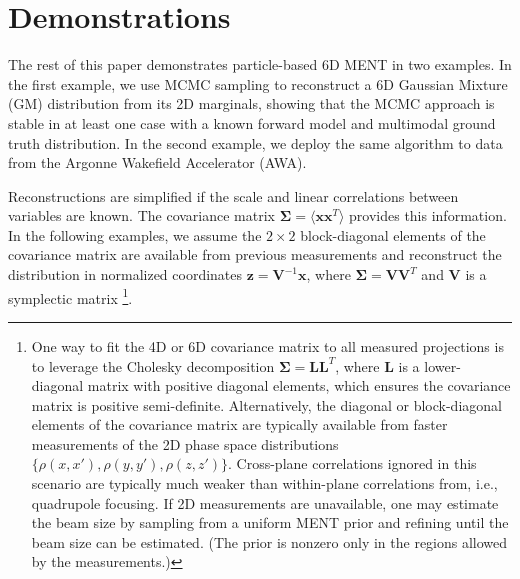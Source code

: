 \documentclass[%
    reprint,
    twocolumn,
    amsmath,
    amssymb,
    aps,
    prstab,
]{revtex4-2}
\begin{document}
\section{Demonstrations}\label{sec:method-demonstration}

The rest of this paper demonstrates particle-based 6D MENT in two examples. In the first example, we use MCMC sampling to reconstruct a 6D Gaussian Mixture (GM) distribution from its 2D marginals, showing that the MCMC approach is stable in at least one case with a known forward model and multimodal ground truth distribution. In the second example, we deploy the same algorithm to data from the Argonne Wakefield Accelerator (AWA).

Reconstructions are simplified if the scale and linear correlations between variables are known. The covariance matrix $\bm{\Sigma} = \langle \bm{x}\bm{x}^T \rangle$ provides this information. In the following examples, we assume the $2 \times 2$ block-diagonal elements of the covariance matrix are available from previous measurements and reconstruct the distribution in normalized coordinates $\bm{z} = \bm{V}^{-1} \bm{x}$, where $\bm{\Sigma} = \bm{V} \bm{V}^T$ and $\bm{V}$ is a symplectic matrix \footnote{One way to fit the 4D or 6D covariance matrix to all measured projections is to leverage the Cholesky decomposition $\bm{\Sigma} = \bm{L}\bm{L}^T$, where $\bm{L}$ is a lower-diagonal matrix with positive diagonal elements, which ensures the covariance matrix is positive semi-definite. Alternatively, the diagonal or block-diagonal elements of the covariance matrix are typically available from faster measurements of the 2D phase space distributions $\{\rho(x, x'), \rho(y, y'), \rho(z, z') \}$. Cross-plane correlations ignored in this scenario are typically much weaker than within-plane correlations from, i.e., quadrupole focusing. If 2D measurements are unavailable, one may estimate the beam size by sampling from a uniform MENT prior and refining until the beam size can be estimated. (The prior is nonzero only in the regions allowed by the measurements.)}.
\end{document}
